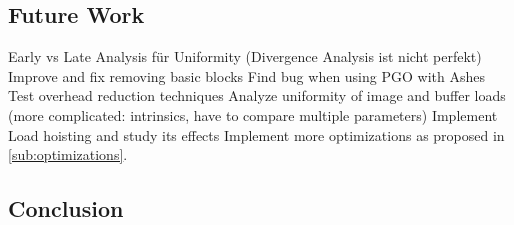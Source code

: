 \subsection{Future Work}
\label{sub:futurework}
Early vs Late Analysis für Uniformity (Divergence Analysis ist nicht perfekt)
Improve and fix removing basic blocks
Find bug when using PGO with Ashes
Test overhead reduction techniques
Analyze uniformity of image and buffer loads (more complicated: intrinsics, have to compare multiple parameters)
Implement Load hoisting and study its effects
Implement more optimizations as proposed in \cref{sub:optimizations}.

\subsection{Conclusion}
\label{sub:conclusion}